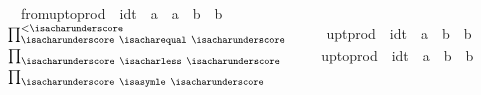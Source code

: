 \begin{isabellebody}
\ \ {\isachardoublequoteopen}{\isacharunderscore}{\kern0pt}from{\isacharunderscore}{\kern0pt}upto{\isacharunderscore}{\kern0pt}prod{\isachardoublequoteclose}\ {\isacharcolon}{\kern0pt}{\isacharcolon}{\kern0pt}\ {\isachardoublequoteopen}idt\ {\isasymRightarrow}\ {\isacharprime}{\kern0pt}a\ {\isasymRightarrow}\ {\isacharprime}{\kern0pt}a\ {\isasymRightarrow}\ {\isacharprime}{\kern0pt}b\ {\isasymRightarrow}\ {\isacharprime}{\kern0pt}b{\isachardoublequoteclose}\isanewline
\ {\isacharparenleft}{\kern0pt}{\isachardoublequoteopen}{\isacharparenleft}{\kern0pt}{}$\prod_{{\isacharunderscore}{\kern0pt}\ {\isacharequal}{\kern0pt}\ {\isacharunderscore}{\kern0pt}}^{<{\isacharunderscore}{\kern0pt}}$\ {\isacharunderscore}{\kern0pt}{\isacharparenright}{\kern0pt}{\isachardoublequoteclose}\ {\isacharbrackleft}{\kern0pt}{}{\isacharcomma}{\kern0pt}{}{\isacharcomma}{\kern0pt}{}{\isacharcomma}{\kern0pt}{}{}{\isacharbrackright}{\kern0pt}\ {}{}{\isacharparenright}{\kern0pt}\isanewline
\ \ {\isachardoublequoteopen}{\isacharunderscore}{\kern0pt}upt{\isacharunderscore}{\kern0pt}prod{\isachardoublequoteclose}\ {\isacharcolon}{\kern0pt}{\isacharcolon}{\kern0pt}\ {\isachardoublequoteopen}idt\ {\isasymRightarrow}\ {\isacharprime}{\kern0pt}a\ {\isasymRightarrow}\ {\isacharprime}{\kern0pt}b\ {\isasymRightarrow}\ {\isacharprime}{\kern0pt}b{\isachardoublequoteclose}\isanewline
\ {\isacharparenleft}{\kern0pt}{\isachardoublequoteopen}{\isacharparenleft}{\kern0pt}{}$\prod_{{\isacharunderscore}{\kern0pt}\ {\isacharless}{\kern0pt}\ {\isacharunderscore}{\kern0pt}}$\ {\isacharunderscore}{\kern0pt}{\isacharparenright}{\kern0pt}{\isachardoublequoteclose}\ {\isacharbrackleft}{\kern0pt}{}{\isacharcomma}{\kern0pt}{}{\isacharcomma}{\kern0pt}{}{}{\isacharbrackright}{\kern0pt}\ {}{}{\isacharparenright}{\kern0pt}\isanewline
\ \ {\isachardoublequoteopen}{\isacharunderscore}{\kern0pt}upto{\isacharunderscore}{\kern0pt}prod{\isachardoublequoteclose}\ {\isacharcolon}{\kern0pt}{\isacharcolon}{\kern0pt}\ {\isachardoublequoteopen}idt\ {\isasymRightarrow}\ {\isacharprime}{\kern0pt}a\ {\isasymRightarrow}\ {\isacharprime}{\kern0pt}b\ {\isasymRightarrow}\ {\isacharprime}{\kern0pt}b{\isachardoublequoteclose}\isanewline
\ {\isacharparenleft}{\kern0pt}{\isachardoublequoteopen}{\isacharparenleft}{\kern0pt}{}$\prod_{{\isacharunderscore}{\kern0pt}\ {\isasymle}\ {\isacharunderscore}{\kern0pt}}$\ {\isacharunderscore}{\kern0pt}{\isacharparenright}{\kern0pt}{\isachardoublequoteclose}\ {\isacharbrackleft}{\kern0pt}{}{\isacharcomma}{\kern0pt}{}{\isacharcomma}{\kern0pt}{}{}{\isacharbrackright}{\kern0pt}\ {}{}{\isacharparenright}{\kern0pt}\isanewline

\end{isabellebody}
